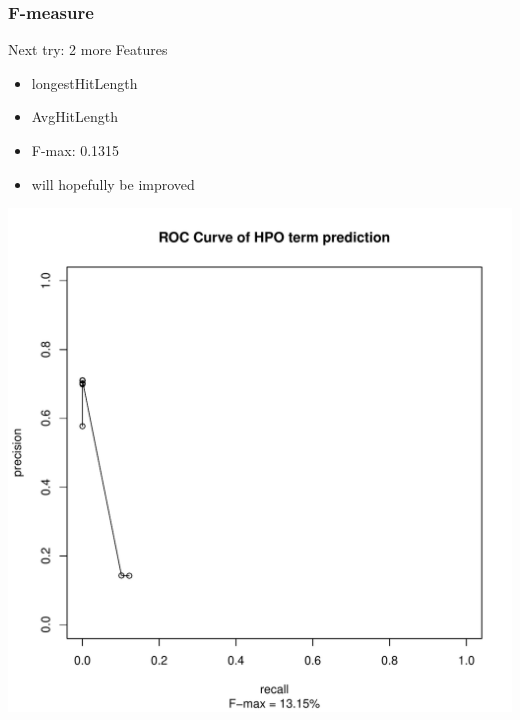 \documentclass{beamer}
\begin{document}
\begin{frame}
\frametitle{F-measure}
\begin{minipage}{0.45\textwidth}
	Next try: 2 more Features
	\begin{itemize}
		\item longestHitLength
		\item AvgHitLength
		\item F-max: 0.1315
		\item will hopefully be improved
		\end{itemize}
	\end{minipage}
	\begin{minipage}{0.5\textwidth}
		\centering	
		\includegraphics[width=\textwidth]{../../data/ROC_2.pdf}
	\end{minipage}
\end{frame}
\end{document}
